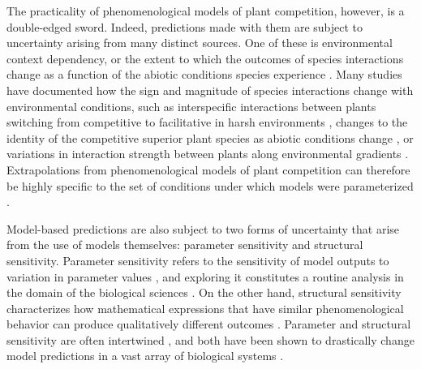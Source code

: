 \begin{refsection}
The practicality of phenomenological models of plant competition, however, is a double-edged sword. Indeed, predictions made with them are subject to uncertainty arising from many distinct sources. One of these is environmental context dependency, or the extent to which the outcomes of species interactions change as a function of the abiotic conditions species experience \citep{chamberlain_how_2014}. Many studies have documented how the sign and magnitude of species interactions change with environmental conditions, such as interspecific interactions between plants switching from competitive to facilitative in harsh environments \citep{callaway_positive_2002, maestre2005change, brooker2008facilitation,maestre2009refining}, changes to the identity of the competitive superior plant species as abiotic conditions change \citep{poorter1986growth, dybzinski2007resource}, or variations in interaction strength between plants along environmental gradients \citep{bimler_accurate_2018, villarreal2009species, lanuza_opposing_2018}. Extrapolations from phenomenological models of plant competition can therefore be highly specific to the set of conditions under which models were parameterized \citep{bimler_accurate_2018}.


Model-based predictions are also subject to two forms of uncertainty that arise from the use of models themselves: parameter sensitivity and structural sensitivity. Parameter sensitivity refers to the sensitivity of model outputs to variation in parameter values \citep{flora_structural_2011}, and exploring it constitutes a routine analysis in the domain of the biological sciences \citep{jorgensen2001fundamentals}. On the other hand, structural sensitivity characterizes how  mathematical expressions that have similar phenomenological behavior can produce qualitatively different outcomes \citep{flora_structural_2011,myerscough1996stability,aldebert2018community}. Parameter and structural sensitivity are often intertwined \citep{wood1999super}, and both have been shown to drastically change model predictions in a vast array of biological systems \citep{flora_structural_2011, wood1999super, poggiale2010far, fussmann2005community,  aldebert2018community}.


\end{refsection}
